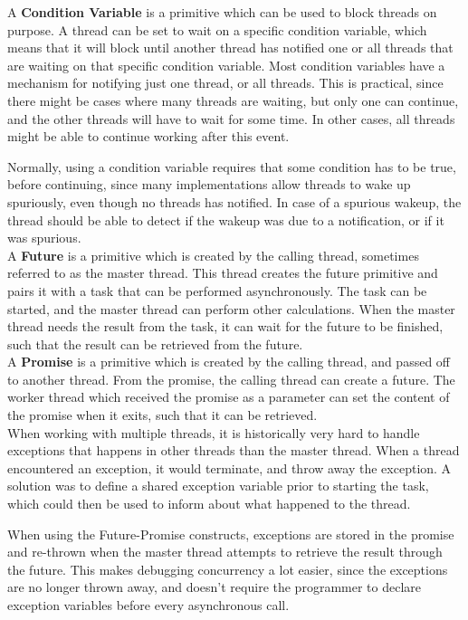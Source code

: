 \documentclass[a4paper]{article}
\begin{document}
A \textbf{Condition Variable} is a primitive which can be used to block threads on purpose. A thread can be set to wait on a specific condition variable, which means that it will block until another thread has notified one or all threads that are waiting on that specific condition variable. Most condition variables have a mechanism for notifying just one thread, or all threads. This is practical, since there might be cases where many threads are waiting, but only one can continue, and the other threads will have to wait for some time. In other cases, all threads might be able to continue working after this event. 

Normally, using a condition variable requires that some condition has to be true, before continuing, since many implementations allow threads to wake up spuriously, even though no threads has notified. In case of a spurious wakeup, the thread should be able to detect if the wakeup was due to a notification, or if it was spurious.\\

A \textbf{Future} is a primitive which is created by the calling thread, sometimes referred to as the master thread. This thread creates the future primitive and pairs it with a task that can be performed asynchronously. The task can be started, and the master thread can perform other calculations. When the master thread needs the result from the task, it can wait for the future to be finished, such that the result can be retrieved from the future.\\

A \textbf{Promise} is a primitive which is created by the calling thread, and passed off to another thread. From the promise, the calling thread can create a future. The worker thread which received the promise as a parameter can set the content of the promise when it exits, such that it can be retrieved.\\

When working with multiple threads, it is historically very hard to handle exceptions that happens in other threads than the master thread. When a thread encountered an exception, it would terminate, and throw away the exception. A solution was to define a shared exception variable prior to starting the task, which could then be used to inform about what happened to the thread. 

When using the Future-Promise constructs, exceptions are stored in the promise and re-thrown when the master thread attempts to retrieve the result through the future. This makes debugging concurrency a lot easier, since the exceptions are no longer thrown away, and doesn't require the programmer to declare exception variables before every asynchronous call.
\end{document}
